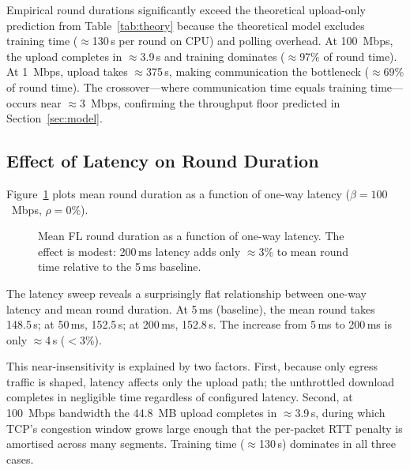 \documentclass[12pt,a4paper]{report}
\begin{document}
Empirical round durations significantly exceed the theoretical upload-only
prediction from Table~\ref{tab:theory} because the theoretical model
excludes training time ($\approx$130\,s per round on CPU) and polling
overhead.  At 100~Mbps, the upload completes in $\approx$3.9\,s and
training dominates ($\approx$97\% of round time).  At 1~Mbps, upload
takes $\approx$375\,s, making communication the bottleneck ($\approx$69\%
of round time).  The crossover---where communication time equals training
time---occurs near $\approx$3~Mbps, confirming the throughput floor
predicted in Section~\ref{sec:model}.

\subsection{Effect of Latency on Round Duration}

Figure~\ref{fig:latency_round} plots mean round duration as a function
of one-way latency ($\beta = 100$~Mbps, $\rho = 0\%$).

\begin{figure}[H]
\centering
{}
\caption{Mean FL round duration as a function of one-way latency.
  The effect is modest: 200\,ms latency adds only $\approx$3\% to mean
  round time relative to the 5\,ms baseline.}
\label{fig:latency_round}
\end{figure}

The latency sweep reveals a surprisingly flat relationship between
one-way latency and mean round duration.  At 5\,ms (baseline), the mean
round takes 148.5\,s; at 50\,ms, 152.5\,s; at 200\,ms, 152.8\,s.  The
increase from 5\,ms to 200\,ms is only $\approx$4\,s ($<$3\%).

This near-insensitivity is explained by two factors.  First, because only
egress traffic is shaped, latency affects only the upload path; the
unthrottled download completes in negligible time regardless of configured
latency.  Second, at 100~Mbps bandwidth the 44.8~MB upload completes in
$\approx$3.9\,s, during which TCP's congestion window grows large enough
that the per-packet RTT penalty is amortised across many segments.
Training time ($\approx$130\,s) dominates in all three cases.
\end{document}
